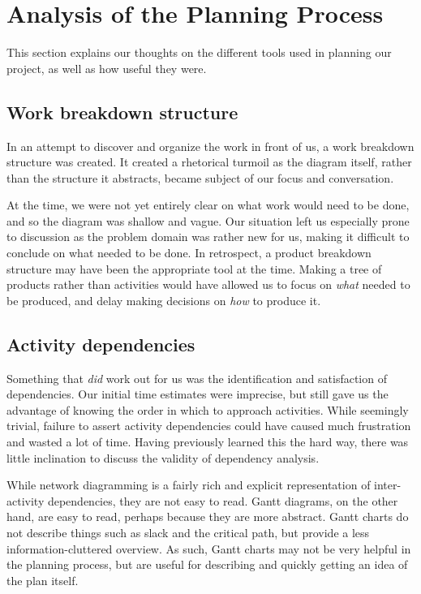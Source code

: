 \section{Analysis of the Planning Process}
\label{sec:AnalysisPlanning}

This section explains our thoughts on the different tools used in planning our
project, as well as how useful they were.

\subsection{Work breakdown structure} In an attempt to discover and organize
the work in front of us, a work breakdown structure was created. It created a
rhetorical turmoil as the diagram itself, rather than the structure it
abstracts, became subject of our focus and conversation.

At the time, we were not yet entirely clear on what work would need to be done,
and so the diagram was shallow and vague. Our situation left us especially
prone to discussion as the problem domain was rather new for us, making it
difficult to conclude on what needed to be done. In retrospect, a product
breakdown structure may have been the appropriate tool at the time. Making a
tree of products rather than activities would have allowed us to focus on
\emph{what} needed to be produced, and delay making decisions on \emph{how} to
produce it\cite[ch.~8.3,~8.4]{caye}.

\subsection{Activity dependencies}
Something that \emph{did} work out for us was the identification and
satisfaction of dependencies. Our initial time estimates were imprecise, but
still gave us the advantage of knowing the order in which to approach
activities. While seemingly trivial, failure to assert activity dependencies
could have caused much frustration and wasted a lot of time. Having previously
learned this the hard way, there was little inclination to discuss the validity
of dependency analysis.

While network diagramming is a fairly rich and explicit representation of
inter-activity dependencies, they are not easy to read. Gantt
diagrams, on the other hand, are easy to read, perhaps because they are more
abstract. Gantt charts do not describe things such as slack and the critical
path, but provide a less information-cluttered overview. As such, Gantt charts
may not be very helpful in the planning process, but are useful for describing
and quickly getting an idea of the plan itself.

